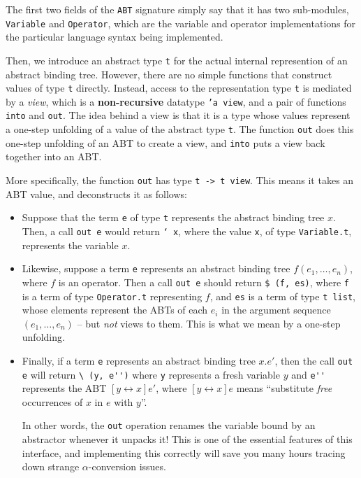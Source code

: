 \documentclass[11pt]{article}
\begin{document}


The first two fields of the \texttt{ABT} signature simply say
that it has two sub-modules, \texttt{Variable} and \texttt{Operator},
which are the variable and operator implementations for the particular
language syntax being implemented.

Then, we introduce an abstract type \texttt{t} for the actual internal
represention of an abstract binding tree.
However, there are no simple functions that construct values of
type \texttt{t} directly. Instead, access to the representation type \texttt{t}
is mediated by a \emph{view}, which is a \textbf{non-recursive} datatype \texttt{'a
  view}, and a pair of functions \texttt{into} and \texttt{out}.
The idea behind a view is that it is a type whose values represent a
one-step unfolding of a value of the abstract type \texttt{t}. The function
\texttt{out} does this one-step unfolding of an ABT to create a view, and \texttt{into} puts a
view back together into an ABT.

More specifically, the function \texttt{out} has type \texttt{t -> t view}. This means it
takes an ABT value, and deconstructs it as follows:


\begin{itemize}
\item Suppose that the term \texttt{e} of type \texttt{t}
  represents the abstract binding tree $x$. Then, a call \texttt{out
    e} would return \texttt{` x}, where the value
  \texttt{x}, of type \texttt{Variable.t}, represents the variable $x$.

\item Likewise, suppose a term \texttt{e} represents an abstract
  binding tree $f(e_1, \ldots, e_n)$, where $f$ is an operator.
  Then a call \texttt{out e} should return \texttt{\$ (f, es)}, where \texttt{f} is a term of
  type \texttt{Operator.t} representing $f$, and \texttt{es} is a term
  of type \texttt{t list}, whose elements represent the
  ABTs of each $e_i$ in the argument sequence $(e_1, \ldots, e_n)$ -- but \emph{not} views to them. This is what we mean by a one-step unfolding.

\item Finally, if a term \texttt{e} represents an abstract binding
  tree $x.e'$, then the call \texttt{out e} will return \verb|\ (y, e'')|
  where \verb|y| represents a fresh variable $y$ and \verb|e''|
  represents the ABT $[y \leftrightarrow x]e'$, where $[y \leftrightarrow x]e$ means
  ``substitute \emph{free} occurrences of $x$ in $e$ with $y$''.

  In other words, the \texttt{out} operation renames the variable bound by
  an abstractor whenever it unpacks it! This is one of the essential
  features of this interface, and implementing this correctly will save you
  many hours tracing down strange $\alpha$-conversion issues.
\end{itemize}
\end{document}
